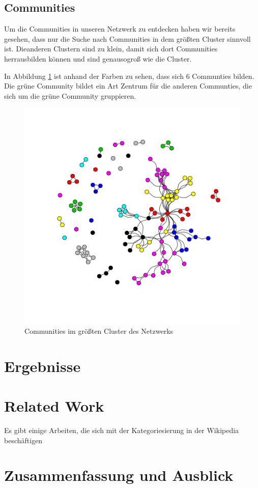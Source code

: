 \documentclass{acm_proc_article-sp}
\begin{document}
\subsection{Communities}
Um die Communities in unseren Netzwerk zu entdecken haben wir bereits gesehen, dass nur die Suche nach Communities in dem größten Cluster sinnvoll ist. Dieanderen Clustern sind zu klein, damit sich dort Communities herrausbilden können und sind genausogroß wie die Cluster.

In Abbildung \ref{fig:communities} ist anhand der Farben zu sehen, dass sich 6 Communties bilden. Die grüne Community bildet ein Art Zentrum für die anderen Communties, die sich um die grüne Community gruppieren.
\begin{figure}[H]
\centering
\includegraphics[scale=0.6]{../visualization/ml_community_graph.png}
\caption{Communities im größten Cluster des Netzwerks}
\label{fig:communities}
\end{figure}
\section{Ergebnisse}
\section{Related Work}
Es gibt einige Arbeiten, die sich mit der Kategoriesierung in der Wikipedia beschäftigen
\section{Zusammenfassung und Ausblick}
\cite{*}

\end{document}
